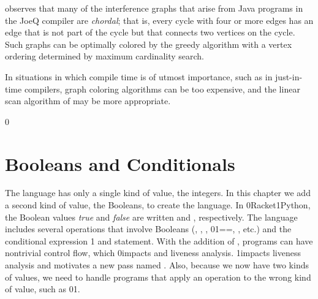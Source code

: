 \documentclass[7x10]{TimesAPriori_MIT}%
\def\racketEd{0}
\def\pythonEd{1}
\providecommand{\BookEdition}{1}
\let\edition\BookEdition
\newcommand{\racket}[1]{{\if\edition\racketEd{#1}\fi}}
\newcommand{\pythonColor}[0]{}
\newcommand{\python}[1]{{\if\edition\pythonEd\pythonColor #1\fi}}
\numberwithin{theorem}{chapter}
\numberwithin{definition}{chapter}
\numberwithin{equation}{chapter}
\begin{document}


\citet{Palsberg:2007si} observes that many of the interference graphs
that arise from Java programs in the JoeQ compiler are \emph{chordal};
that is, every cycle with four or more edges has an edge that is not
part of the cycle but that connects two vertices on the cycle. Such
graphs can be optimally colored by the greedy algorithm with a vertex
ordering determined by maximum cardinality search.

In situations in which compile time is of utmost importance, such as
in just-in-time compilers, graph coloring algorithms can be too
expensive, and the linear scan algorithm of \citet{Poletto:1999uq} may
be more appropriate.


{\if\edition\racketEd
{}
\fi}
\chapter{Booleans and Conditionals}
\label{ch:Lif}
\setcounter{footnote}{0}

The \LangVar{} language has only a single kind of value, the
integers. In this chapter we add a second kind of value, the Booleans,
to create the \LangIf{} language. In \racket{Racket}\python{Python},
the Boolean values \emph{true} and \emph{false}
are written
\TRUE{} and
\FALSE{}, respectively.  The \LangIf{}
language includes several operations that involve Booleans
(,
,
,
\racket{}\python{==},
\key{<}, etc.) and the
conditional expression%
\python{ and statement}.
With the addition of , programs can have
nontrivial control flow, which
%
\racket{impacts  and liveness analysis.}%
%
\python{impacts liveness analysis and motivates a new pass named
  \code{explicate\_control}.}
%
Also, because we now have two kinds of values, we need to handle
programs that apply an operation to the wrong kind of value, such as
\racket{}\python{}.
\end{document}
